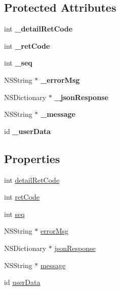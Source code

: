 \subsection*{Protected Attributes}
\begin{DoxyCompactItemize}
\item 
\mbox{\label{interface_a_p_i_response_a54f4b35f0f6a6c17f16db53b092ccd10}} 
int {\bfseries \+\_\+detail\+Ret\+Code}
\item 
\mbox{\label{interface_a_p_i_response_a6b27f295077c706eb402a33191be4052}} 
int {\bfseries \+\_\+ret\+Code}
\item 
\mbox{\label{interface_a_p_i_response_a49508c7f86db0038498a3d9fb3300578}} 
int {\bfseries \+\_\+seq}
\item 
\mbox{\label{interface_a_p_i_response_a107c43181646f5568fd6d9445660edc8}} 
N\+S\+String $\ast$ {\bfseries \+\_\+error\+Msg}
\item 
\mbox{\label{interface_a_p_i_response_a2ba64a7929be305bd31dd05b6ca8abaa}} 
N\+S\+Dictionary $\ast$ {\bfseries \+\_\+json\+Response}
\item 
\mbox{\label{interface_a_p_i_response_aab508f85be54c8bec5ca376d81ba45f5}} 
N\+S\+String $\ast$ {\bfseries \+\_\+message}
\item 
\mbox{\label{interface_a_p_i_response_a18fe599206b33775cd113913c5fbcf20}} 
id {\bfseries \+\_\+user\+Data}
\end{DoxyCompactItemize}
\subsection*{Properties}
\begin{DoxyCompactItemize}
\item 
int \mbox{\hyperlink{interface_a_p_i_response_a3d61cd58f1b9fa5709fec34997fac91a}{detail\+Ret\+Code}}
\item 
int \mbox{\hyperlink{interface_a_p_i_response_a988581b4a4f55a4c1672d874fdbc3ba7}{ret\+Code}}
\item 
int \mbox{\hyperlink{interface_a_p_i_response_af7e1d9dd5056ce83c728353e75d5695d}{seq}}
\item 
N\+S\+String $\ast$ \mbox{\hyperlink{interface_a_p_i_response_a48a5d12a6c19dfe75637a9e17b092e55}{error\+Msg}}
\item 
N\+S\+Dictionary $\ast$ \mbox{\hyperlink{interface_a_p_i_response_a283b0d4f2825ce011fdeab372c2751ad}{json\+Response}}
\item 
N\+S\+String $\ast$ \mbox{\hyperlink{interface_a_p_i_response_ad1c33f32f800e5d05f91a1cbc26af31a}{message}}
\item 
id \mbox{\hyperlink{interface_a_p_i_response_a74c4ca779214d1d867b2dbfcfc6085f0}{user\+Data}}
\end{DoxyCompactItemize}


